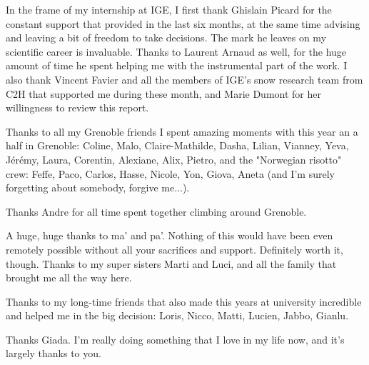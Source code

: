 \documentclass[11pt,a4paper]{article}
\renewcommand{\baselinestretch}{1.5}
\begin{document}
In the frame of my internship at IGE, I first thank Ghislain Picard for the constant support that provided in the last six months, at the same time advising and leaving a bit of freedom to take decisions. The mark he leaves on my scientific career is invaluable. Thanks to Laurent Arnaud as well, for the huge amount of time he spent helping me with the instrumental part of the work. I also thank Vincent Favier and all the members of IGE's snow research team from C2H that supported me during these month, and Marie Dumont for her willingness to review this report.

Thanks to all my Grenoble friends I spent amazing moments with this year an a half in Grenoble: Coline, Malo, Claire-Mathilde, Dasha, Lilian, Vianney, Yeva, Jérémy, Laura, Corentin, Alexiane, Alix, Pietro, and the "Norwegian risotto" crew: Feffe, Paco, Carlos, Hasse, Nicole, Yon, Giova, Aneta (and I'm surely forgetting about somebody, forgive me...). 

Thanks Andre for all time spent together climbing around Grenoble.

A huge, huge thanks to ma' and pa'. Nothing of this would have been even remotely possible without all your sacrifices and support. Definitely worth it, though.
Thanks to my super sisters Marti and Luci, and all the family that brought me all the way here.

Thanks to my long-time friends that also made this years at university incredible and helped me in the big decision: Loris, Nicco, Matti, Lucien, Jabbo, Gianlu.

Thanks Giada. I'm really doing something that I love in my life now, and it's largely thanks to you.
\newpage

\setlength{\abovedisplayskip}{5pt}
\setlength{\belowdisplayskip}{5pt}

\renewcommand{\baselinestretch}{1}\normalsize
\tableofcontents
\setcounter{page}{1}
\renewcommand{\baselinestretch}{1.5}\normalsize
\newpage
\end{document}
